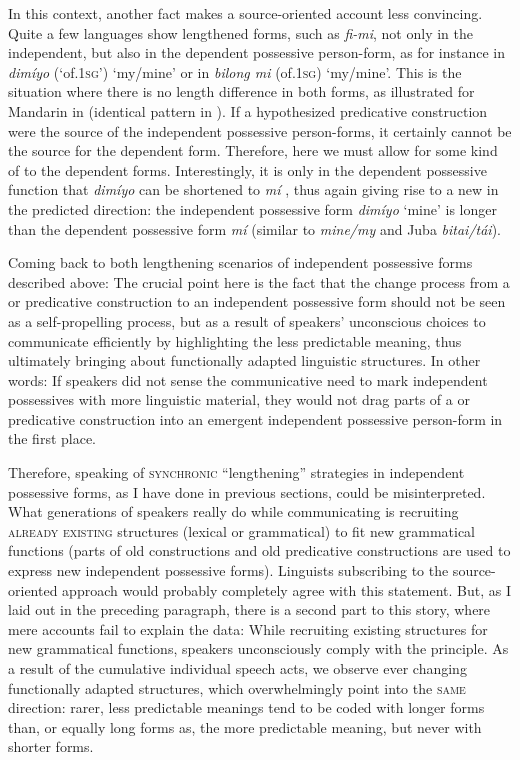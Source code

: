 \documentclass[output=paper]{langsci/langscibook}
\begin{document}
In this context, another fact makes a source-oriented account less convincing. Quite a few  languages show lengthened forms, such as \textit{fi-mi}, not only in the independent, but also in the dependent possessive person-form, as for instance in  \textit{dimíyo} (‘of.1\textsc{sg}’) ‘my/mine’ or in  \textit{bilong mi} (of.1\textsc{sg}) ‘my/mine’. This is the situation where there is no length difference in both forms, as illustrated for Mandarin  in  (identical pattern in ). If a hypothesized predicative construction were the source of the independent possessive person-forms, it certainly cannot be the source for the dependent form. Therefore, here we must allow for some kind of  to the dependent forms. Interestingly, it is only in the dependent possessive function that \textit{dimíyo} can be shortened to \textit{mí} \citep{Steinkrüger2013}, thus again giving rise to a new  in the predicted direction: the independent possessive form \textit{dimíyo} ‘mine’ is longer than the dependent possessive form \textit{mí} (similar to  \textit{mine/my} and Juba  \textit{bitai/tái}).

Coming back to both lengthening scenarios of independent possessive forms described above: The crucial point here is the fact that the change process from a  or predicative construction to an independent possessive form should not be seen as a self-propelling  process, but as a result of speakers' unconscious choices to communicate efficiently by highlighting the less predictable meaning, thus ultimately bringing about functionally adapted linguistic structures. In other words: If speakers did not sense the communicative need to mark independent possessives with more linguistic material, they would not drag parts of a  or predicative construction into an emergent independent possessive person-form in the first place. 

Therefore, speaking of \textsc{synchronic} “lengthening” strategies in independent possessive forms, as I have done in previous sections, could be misinterpreted. What generations of speakers really do while communicating is recruiting \textsc{already} \textsc{existing} structures (lexical or grammatical) to fit new grammatical functions (parts of old  constructions and old predicative constructions are used to express new independent possessive forms). Linguists subscribing to the source-oriented approach would probably completely agree with this statement. But, as I laid out in the preceding paragraph, there is a second part to this story, where mere  accounts fail to explain the data: While recruiting existing structures for new grammatical functions, speakers unconsciously comply with the  principle. As a result of the cumulative individual speech acts, we observe ever changing functionally adapted structures, which overwhelmingly point into the \textsc{same} direction: rarer, less predictable meanings tend to be coded with longer forms than, or equally long forms as, the more predictable meaning, but never with shorter forms. 
\end{document}
